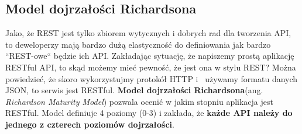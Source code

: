 \documentclass[oneside,polski,logo,indent]{amuthesis}
\begin{document}
\begin{center}
\section{Model dojrzałości Richardsona}
\end{center}

Jako, że REST jest tylko zbiorem wytycznych i dobrych rad dla tworzenia API, to deweloperzy mają bardzo dużą elastyczność do definiowania jak bardzo ``REST-owe`` będzie ich API. Zakładając sytuację, że napiszemy prostą aplikację RESTful API, to skąd możemy mieć pewność, że jest ona w stylu REST? Można powiedzieć, że skoro wykorzystujmy protokół HTTP i~ używamy formatu danych JSON, to serwis jest RESTful. \textbf{Model dojrzałości Richardsona}(ang. \emph{Richardson Maturity Model}) pozwala ocenić w jakim stopniu aplikacja jest RESTful. Model definiuje 4 poziomy (0-3) i zakłada, że \textbf{każde API należy do jednego z czterech poziomów dojrzałości}.
\end{document}
